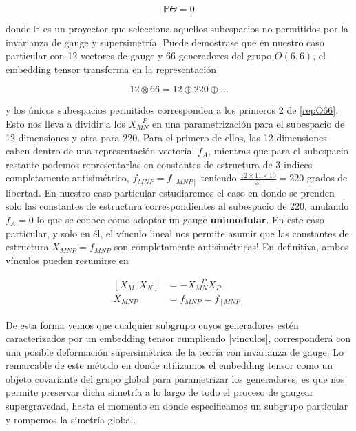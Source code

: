 \documentclass{article}
\numberwithin{equation}{section}
\begin{document}
\begin{equation}\label{vinculolineal}
\mathbb{P} \Theta = 0
\end{equation} 

donde $ \mathbb{P} $ es un proyector que selecciona aquellos subespacios no permitidos por la invarianza de gauge y supersimetría. Puede demostrase que en nuestro caso particular con 12 vectores de gauge y 66 generadores del grupo $ O(6,6) $, el embedding tensor transforma en la representación

\begin{equation}\label{repO66}
12 \otimes 66 = 12 \oplus 220 \oplus \dots
\end{equation}

y los únicos subespacios permitidos corresponden a los primeros 2 de \ref{repO66}. Esto nos lleva a dividir a los $ X_{M N}^{\ \ \ \ P} $ en una parametrización para el subespacio de 12 dimensiones y otra para 220. Para el primero de ellos, las 12 dimensiones caben dentro de una representación vectorial $ f_{A} $, mientras que para el subespacio restante podemos representarlas en constantes de estructura de 3 indices completamente antisimétrico, $ f_{M N P} = f_{\left[M N P\right]} $ teniendo $ \frac{12 \times 11 \times 10}{3!} = 220 $ grados de libertad. En nuestro caso particular estudiaremos el caso en donde se prenden solo las constantes de estructura correspondientes al subespacio de 220, anulando $ f_{A}=0 $ lo que se conoce como adoptar un gauge \textbf{unimodular}. En este caso particular, y solo en él, el vínculo lineal nos permite asumir que las constantes de estructura $ X_{M N P} = f_{M N P}  $ son completamente antisimétricas! En definitiva, ambos vínculos pueden resumirse en

\begin{boxquation}
\begin{equation}\label{vinculos}
\begin{aligned}
\left[X_M, X_N\right] &= - X_{M N}^{\ \ \ \ P} X_P\\
X_{M N P} &= f_{M N P} = f_{\left[M N P\right]}
\end{aligned}
\end{equation}
\end{boxquation}

De esta forma vemos que cualquier subgrupo cuyos generadores estén caracterizados por un embedding tensor cumpliendo \ref{vinculos}, corresponderá con una posible deformación supersimétrica de la teoría con invarianza de gauge. Lo remarcable de este método en donde utilizamos el embedding tensor como un objeto covariante del grupo global para parametrizar los generadores, es que nos permite preservar dicha simetría a lo largo de todo el proceso de gaugear supergravedad, hasta el momento en donde especificamos un subgrupo particular y rompemos la simetría global.\\
\end{document}
